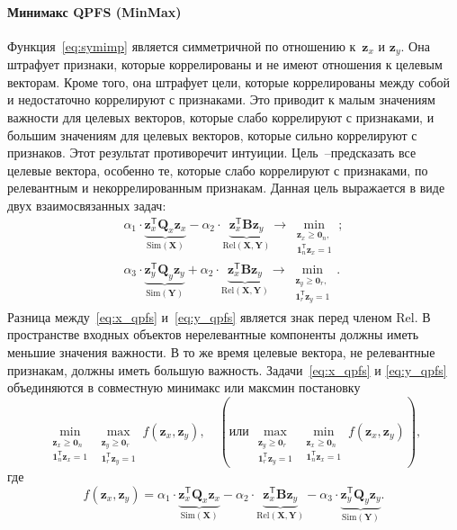 \documentclass[preprint,12pt]{elsarticle}
\theoremstyle{definition}
\newcommand{\bz}{\mathbf{z}}
\newcommand{\bY}{\mathbf{Y}}
\newcommand{\bX}{\mathbf{X}}
\newcommand{\bB}{\mathbf{B}}
\newcommand{\bQ}{\mathbf{Q}}
\newcommand{\T}{\mathsf{T}}
\newcommand{\bOne}{\boldsymbol{1}}
\newcommand{\bZero}{\boldsymbol{0}}
\begin{document}
\paragraph{Минимакс QPFS (MinMax)}
Функция~\eqref{eq:symimp} является симметричной по отношению к~$\bz_x$ и $\bz_y$.
Она штрафует признаки, которые коррелированы и не имеют отношения к целевым векторам.
Кроме того, она штрафует цели, которые коррелированы между собой и недостаточно коррелируют с признаками.
Это приводит к малым значениям важности для целевых векторов, которые слабо коррелируют с признаками, и большим значениям для целевых векторов, которые сильно коррелируют с признаков.
Этот результат противоречит интуиции.
Цель~--предсказать все целевые вектора, особенно те, которые слабо коррелируют с признаками, по релевантным и некоррелированным признакам. Данная цель выражается в виде двух взаимосвязанных задач:
\begin{align}
\alpha_1 \cdot \underbrace{\bz_x^{\T} \bQ_x \bz_x}_{\text{Sim}(\bX)} - \alpha_2 \cdot \underbrace{ \bz_x^{\T}\mathbf{B} \bz_y}_{\text{Rel}(\bX, \bY)} \rightarrow \min_{\substack{\bz_x \geq \bZero_n, \\ \bOne_n^{\T}\bz_x=1}};
\label{eq:x_qpfs}\\
\alpha_3 \cdot \underbrace{\bz_y^{\T} \bQ_y \bz_y}_{\text{Sim}(\bY)} + \alpha_2 \cdot \underbrace{ \bz_x^{\T} \mathbf{B} \bz_y}_{\text{Rel}(\bX, \bY)} \rightarrow \min_{\substack{\bz_y \geq \bZero_r,  \\ \bOne_r^{\T}\bz_y=1}}.
\label{eq:y_qpfs}
\end{align}
Разница между~\eqref{eq:x_qpfs} и~\eqref{eq:y_qpfs} является знак перед членом Rel.
В пространстве входных объектов нерелевантные компоненты должны иметь меньшие значения важности.
В то же время целевые вектора, не релевантные признакам, должны иметь большую важность.
Задачи~\eqref{eq:x_qpfs} и \eqref{eq:y_qpfs} объединяются в совместную минимакс или максмин постановку
\begin{equation}
\min_{\substack{\bz_x \geq \bZero_n \\ \bOne_n^{\T}\bz_x=1}} 	\max_{\substack{\bz_y \geq \bZero_r \\ \bOne_r^{\T}\bz_y=1}} f(\bz_x, \bz_y), \quad \left(\text {или} \, \max_{\substack{\bz_y \geq \bZero_r \\ \bOne_r^{\T}\bz_y=1}} \min_{\substack{\bz_x \geq \bZero_n \\ \bOne_n^{\T}\bz_x=1}} f(\bz_x, \bz_y)\right),
\label{eq:minmax}
\end{equation}
где
\begin{equation*}
f(\bz_x, \bz_y) = \alpha_1 \cdot \underbrace{\bz_x^{\T} \bQ_x \bz_x}_{\text{Sim}(\bX)} - \alpha_2 \cdot \underbrace{\bz_x^{\T} \bB \bz_y}_{\text{Rel}(\bX, \bY)} - \alpha_3 \cdot \underbrace{\bz_y^{\T} \bQ_y \bz_y}_{\text{Sim}(\bY)}.
\end{equation*}
\end{document}
